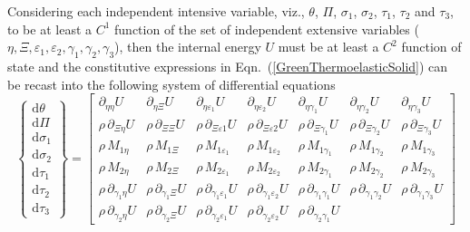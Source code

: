 Considering each independent intensive variable, viz., $\theta$, $\Pi$, $\sigma_1$, $\sigma_2$, $\tau_1$, $\tau_2$ and $\tau_3$, to be at least a $C^1$ function of the set of independent extensive variables ($\eta , \Xi , \varepsilon_1 , \varepsilon_2 , \gamma_1 , \gamma_2 , \gamma_3 $), then the internal energy $U$ must be at least a $C^2$ function of state and the constitutive expressions in Eqn.~(\ref{GreenThermoelasticSolid}) can be recast into the following system of differential equations
\begin{equation}
\left\{ \begin{matrix}
\mathrm{d} \theta \\ \mathrm{d} \Pi \\
\mathrm{d} \sigma_1 \\ \mathrm{d} \sigma_2 \\ 
\mathrm{d} \tau_1 \\ \mathrm{d} \tau_2 \\ \mathrm{d} \tau_3
\end{matrix} \right\} = \begin{bmatrix}
\partial_{\eta\eta} U & 
\partial_{\eta\Xi} U & 
\partial_{\eta\varepsilon_1} U & 
\partial_{\eta\varepsilon_2} U &
\partial_{\eta\gamma_1} U &
\partial_{\eta\gamma_2} U &
\partial_{\eta\gamma_3} U \\ 
\rho \, \partial_{\Xi\eta} U & 
\rho \, \partial_{\Xi\Xi} U & 
\rho \, \partial_{\Xi\varepsilon1} U &
\rho \, \partial_{\Xi\varepsilon2} U &
\rho \, \partial_{\Xi\gamma_1} U &
\rho \, \partial_{\Xi\gamma_2} U &
\rho \, \partial_{\Xi\gamma_3} U \\
\rho \, M_{1\eta} & 
\rho \, M_{1\Xi} & 
\rho \, M_{1\varepsilon_1} & 
\rho \, M_{1\varepsilon_2} &
\rho \, M_{1\gamma_1} &
\rho \, M_{1\gamma_2} &
\rho \, M_{1\gamma_3} \\
\rho \, M_{2\eta} & 
\rho \, M_{2\Xi} & 
\rho \, M_{2\varepsilon_1} & 
\rho \, M_{2\varepsilon_2} &
\rho \, M_{2\gamma_1} &
\rho \, M_{2\gamma_2} &
\rho \, M_{2\gamma_3} \\
\rho \, \partial_{\gamma_1\eta} U & 
\rho \, \partial_{\gamma_1\Xi} U & 
\rho \, \partial_{\gamma_1\varepsilon_1} U & 
\rho \, \partial_{\gamma_1\varepsilon_2} U &
\rho \, \partial_{\gamma_1\gamma_1} U  &
\rho \, \partial_{\gamma_1\gamma_2} U &
\rho \, \partial_{\gamma_1\gamma_3} U \\
\rho \, \partial_{\gamma_2\eta} U & 
\rho \, \partial_{\gamma_2\Xi} U & 
\rho \, \partial_{\gamma_2\varepsilon_1} U & 
\rho \, \partial_{\gamma_2\varepsilon_2} U &
\rho \, \partial_{\gamma_2\gamma_1} U  &

\end{bmatrix}
\end{equation}
